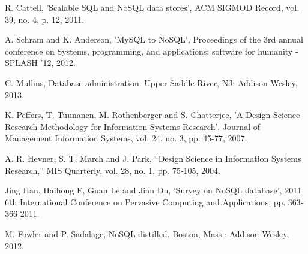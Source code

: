 \begin{thebibliography}{69}


 R. Cattell, 'Scalable SQL and NoSQL data stores', ACM SIGMOD Record, vol. 39, no. 4, p. 12, 2011.

 A. Schram and K. Anderson, 'MySQL to NoSQL', Proceedings of the 3rd annual conference on Systems, programming, and applications: software for humanity - SPLASH '12, 2012.

 C. Mullins, Database administration. Upper Saddle River, NJ: Addison-Wesley, 2013.

 K.  Peffers, T.  Tuunanen, M.  Rothenberger and S.  Chatterjee, 'A Design Science Research Methodology for Information Systems Research', Journal of Management Information Systems, vol. 24, no. 3, pp. 45-77, 2007.




 A. R. Hevner, S. T. March and J. Park, “Design Science in Information Systems
Research,” MIS Quarterly, vol. 28, no. 1, pp. 75-105, 2004.


 Jing Han, Haihong E, Guan Le and Jian Du, 'Survey on NoSQL database', 2011 6th International Conference on Pervasive Computing and Applications, pp. 363-366 2011.

 M. Fowler and P. Sadalage, NoSQL distilled. Boston, Mass.: Addison-Wesley, 2012.


\end{thebibliography}

